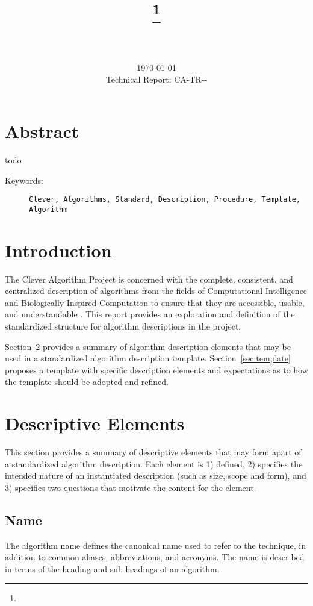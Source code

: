 \documentclass[a4paper, 11pt]{article}
\title{{\myreporttitle}\footnote{\myreportlicense}}
\author{\myreportauthor\\{\myreportemail}\\\small\myreportproject}
\date{\today\\{\small{Technical Report: CA-TR-{\myreportdate}-\myreportversion}}}
\begin{document}
\maketitle

\section*{Abstract} 
todo

\begin{description}
	\item[Keywords:] {\small\texttt{Clever, Algorithms, Standard, Description, Procedure, Template, Algorithm}}
\end{description} 

\section{Introduction}
\label{sec:introduction}
The Clever Algorithm Project is concerned with the complete, consistent, and centralized description of algorithms from the fields of Computational Intelligence and Biologically Inspired Computation to ensure that they are accessible, usable, and understandable \cite{Brownlee2010}.
This report provides an exploration and definition of the standardized structure for algorithm descriptions in the project.

Section~\ref{sec:elements} provides a summary of algorithm description elements that may be used in a standardized algorithm description template. Section~\ref{sec:template} proposes a template with specific description elements and expectations as to how the template should be adopted and refined.

\section{Descriptive Elements}
\label{sec:elements}
This section provides a summary of descriptive elements that may form apart of a standardized algorithm description. Each element is 1) defined, 2) specifies the intended nature of an instantiated description (such as size, scope and form), and 3) specifies two questions that motivate the content for the element.

\subsection{Name}
The algorithm name defines the canonical name used to refer to the technique, in addition to common aliases, abbreviations, and acronyms. The name is described in terms of the heading and sub-headings of an algorithm.
\end{document}
